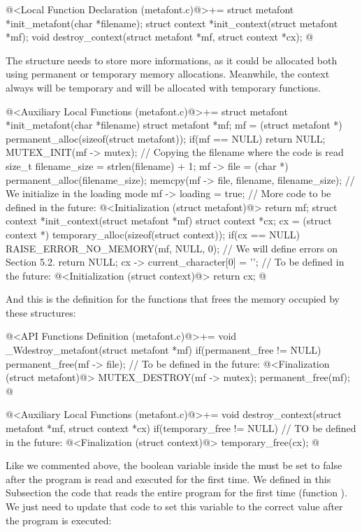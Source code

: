 \iniciocodigo
@<Local Function Declaration (metafont.c)@>+=
struct metafont *init_metafont(char *filename);
struct context *init_context(struct metafont *mf);
void destroy_context(struct metafont *mf, struct context *cx);
@
\fimcodigo

The structure  needs to store more informations,
as it could be allocated both using permanent or temporary memory
allocations. Meanwhile, the context always will be temporary and will
be allocated with temporary functions.

\iniciocodigo
@<Auxiliary Local Functions (metafont.c)@>+=
struct metafont *init_metafont(char *filename){
  struct metafont *mf;
  mf = (struct metafont *) permanent_alloc(sizeof(struct metafont));
  if(mf == NULL)
    return NULL;
  MUTEX_INIT(mf -> mutex);
  // Copying the filename where the code is read
  size_t filename_size = strlen(filename) + 1;
  mf -> file = (char *) permanent_alloc(filename_size);
  memcpy(mf -> file, filename, filename_size);
  // We initialize in the loading mode
  mf -> loading = true;
  // More code to be defined in the future:
  @<Initialization (struct metafont)@>
  return mf;
}
struct context *init_context(struct metafont *mf){
  struct context *cx;
  cx = (struct context *) temporary_alloc(sizeof(struct context));
  if(cx == NULL){
    RAISE_ERROR_NO_MEMORY(mf, NULL, 0); // We will define errors on Section 5.2.
    return NULL;
  }
  cx -> current_character[0] = '\0';
  // To be defined in the future:
  @<Initialization (struct context)@>
  return cx;
}
@
\fimcodigo

And this is the definition for the functions that frees the memory
occupied by these structures:

\iniciocodigo
@<API Functions Definition (metafont.c)@>+=
void _Wdestroy_metafont(struct metafont *mf){
  if(permanent_free != NULL){
    permanent_free(mf -> file);
    // To be defined in the future:
    @<Finalization (struct metafont)@>
    MUTEX_DESTROY(mf -> mutex);
    permanent_free(mf);
  }
}
@
\fimcodigo

\iniciocodigo
@<Auxiliary Local Functions (metafont.c)@>+=
void destroy_context(struct metafont *mf, struct context *cx){
  if(temporary_free != NULL){
    // TO be defined in the future:
    @<Finalization (struct context)@>
    temporary_free(cx);
  }
}
@
\fimcodigo

Like we commented above, the boolean variable 
inside the  must be set to false after the
program is read and executed for the first time. We defined in this
Subsection the code that reads the entire program for the first time
(function ). We just need to update that
code to set this variable to the correct value after the program is
executed:

